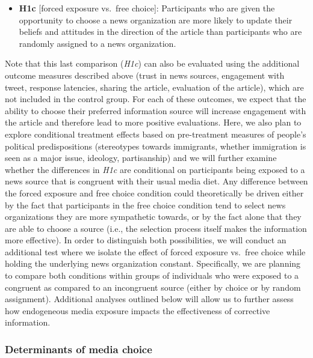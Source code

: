 \documentclass[]{article}
\providecommand{\tightlist}{%
  \setlength{\itemsep}{0pt}\setlength{\parskip}{0pt}}
\begin{document}
\begin{itemize}
\tightlist
\item
  \textbf{H1c} {[}forced exposure vs.~free choice{]}: Participants who
  are given the opportunity to choose a news organization are more
  likely to update their beliefs and attitudes in the direction of the
  article than participants who are randomly assigned to a news
  organization.
\end{itemize}

Note that this last comparison (\emph{H1c}) can also be evaluated using
the additional outcome measures described above (trust in news sources,
engagement with tweet, response latencies, sharing the article,
evaluation of the article), which are not included in the control group.
For each of these outcomes, we expect that the ability to choose their
preferred information source will increase engagement with the article
and therefore lead to more positive evaluations. Here, we also plan to
explore conditional treatment effects based on pre-treatment measures of
people's political predispositions (stereotypes towards immigrants,
whether immigration is seen as a major issue, ideology, partisanship)
and we will further examine whether the differences in \emph{H1c} are
conditional on participants being exposed to a news source that is
congruent with their usual media diet. Any difference between the forced
exposure and free choice condition could theoretically be driven either
by the fact that participants in the free choice condition tend to
select news organizations they are more sympathetic towards, or by the
fact alone that they are able to choose a source (i.e., the selection
process itself makes the information more effective). In order to
distinguish both possibilities, we will conduct an additional test where
we isolate the effect of forced exposure vs.~free choice while holding
the underlying news organization constant. Specifically, we are planning
to compare both conditions within groups of individuals who were exposed
to a congruent as compared to an incongruent source (either by choice or
by random assignment). Additional analyses outlined below will allow us
to further assess how endogeneous media exposure impacts the
effectiveness of corrective information.

\hypertarget{determinants-of-media-choice}{%
\subsubsection{Determinants of media
choice}\label{determinants-of-media-choice}}
\end{document}
